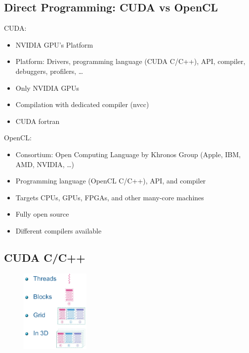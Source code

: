 \subsection{Direct Programming: CUDA vs OpenCL}

\begin{multicols}{2}
	CUDA:
	\begin{itemize}
		\item NVIDIA GPU’s Platform
		\item Platform: Drivers, programming language (CUDA C/C++), API, compiler, debuggers, profilers, …
		\item Only NVIDIA GPUs
		\item Compilation with dedicated compiler (nvcc)
		\item CUDA fortran
	\end{itemize}
	
	\columnbreak
	
	OpenCL:
	\begin{itemize}
		\item Consortium: Open Computing Language by Khronos Group (Apple, IBM, AMD, NVIDIA, …)
		\item Programming language (OpenCL C/C++), API, and compiler
		\item Targets CPUs, GPUs, FPGAs, and other many-core machines
		\item Fully open source
		\item Different compilers available
	\end{itemize}
\end{multicols}

\subsection{CUDA C/C++}

\begin{figure}
	\begin{center}
		\includegraphics[width=0.3\textwidth]{figure_parallel/cuda_c_cpp.png}
	\end{center}
\end{figure}

